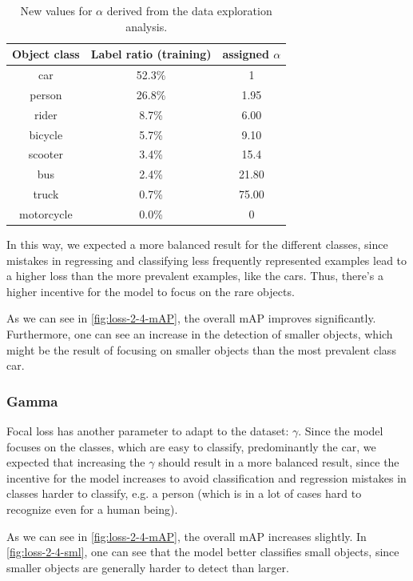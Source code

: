 \documentclass{article}
\begin{document}
\begin{table}[h!]
    \centering
    \begin{tabular}{c|c|c}
    Object class & Label ratio (training) & assigned $\alpha$\\
    \hline
    car & 52.3\% & 1\\
    person & 26.8\% & 1.95\\
    rider & 8.7\% & 6.00 \\
    bicycle & 5.7\% & 9.10 \\
    scooter & 3.4\% & 15.4 \\
    bus & 2.4\% & 21.80 \\
    truck & 0.7\% & 75.00 \\
    motorcycle & 0.0\% & 0 \\
    \end{tabular}
    \caption{New values for $\alpha$ derived from the data exploration analysis.}
    \label{tab:alpha}
\end{table}

In this way, we expected a more balanced result for the different classes, since mistakes in regressing and classifying less frequently represented examples lead to a higher loss than the more prevalent examples, like the cars. Thus, there's a higher incentive for the model to focus on the rare objects.

As we can see in \ref{fig:loss-2-4-mAP}, the overall mAP improves significantly. Furthermore, one can see an increase in the detection of smaller objects, which might be the result of focusing on smaller objects than the most prevalent class car.

\subsubsection*{Gamma}

Focal loss has another parameter to adapt to the dataset: $\gamma$. Since the model focuses on the classes, which are easy to classify, predominantly the car, we expected that increasing the $\gamma$ should result in a more balanced result, since the incentive for the model increases to avoid classification and regression mistakes in classes harder to classify, e.g. a person (which is in a lot of cases hard to recognize even for a human being).

As we can see in \ref{fig:loss-2-4-mAP}, the overall mAP increases slightly. In \ref{fig:loss-2-4-sml}, one can see that the model better classifies small objects, since smaller objects are generally harder to detect than larger.
\end{document}
